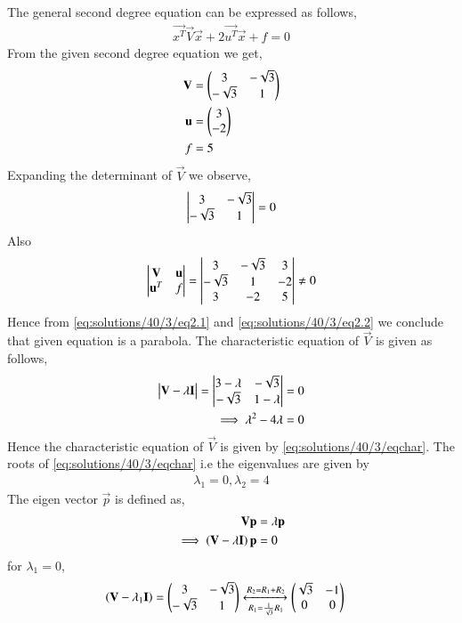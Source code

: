 The general second degree equation can be expressed as follows,
\begin{align}
\vec{x^T}\vec{V}\vec{x}+2\vec{u^T}\vec{x}+f=0\label{eq:solutions/40/3/eqmain}
\end{align}
From the given second degree equation we get,
\begin{align}
\mathbf{V} &= \begin{pmatrix}3&-\sqrt{3}\\-\sqrt{3}&1\end{pmatrix}\\ \label{eq:solutions/40/3/given1}
\mathbf{u} &= \begin{pmatrix}3\\-2\end{pmatrix}\\ 
f &= 5 \label{eq:solutions/40/3/given2}
\end{align}
Expanding the determinant of $\vec{V}$ we observe, 
\begin{align}
\begin{vmatrix}3&-\sqrt{3}\\-\sqrt{3}&1\end{vmatrix} = 0 \label{eq:solutions/40/3/eq2.1}
\end{align}
Also
\begin{align}
    \begin{vmatrix}\mathbf{V}&\mathbf{u} \\\mathbf{u}^T & f\end{vmatrix}=
    \begin{vmatrix}3&-\sqrt{3}&3\\-\sqrt{3}&1 &-2\\3 &-2&5\end{vmatrix}
    \neq 0\label{eq:solutions/40/3/eq2.2}\end{align}
Hence from \eqref{eq:solutions/40/3/eq2.1} and \eqref{eq:solutions/40/3/eq2.2} we conclude that given equation is a parabola. The characteristic equation of $\vec{V}$ is given as follows,
\begin{align}
\begin{vmatrix}\mathbf{V}-\lambda\mathbf{I}\end{vmatrix} = \begin{vmatrix}3-\lambda &-\sqrt{3}\\-\sqrt{3}& 1-\lambda\end{vmatrix} &= 0\\
\implies \lambda^2-4\lambda &= 0\label{eq:solutions/40/3/eqchar}
\end{align}
Hence the characteristic equation of $\vec{V}$ is given by \eqref{eq:solutions/40/3/eqchar}. The roots of \eqref{eq:solutions/40/3/eqchar} i.e the eigenvalues are given by
\begin{align}
\lambda_1=0, \lambda_2=4\label{eq:solutions/40/3/eqeigenvals}    
\end{align}
The eigen vector $\vec{p}$ is defined as, 
\begin{align}
\mathbf{V}\mathbf{p} &= \lambda\mathbf{p}\\
\implies\left(\mathbf{V}-\lambda\mathbf{I}\right)\mathbf{p}&=0 \label{eq:solutions/40/3/eqev}
\end{align}
for $\lambda_1=0$,
\begin{align}
\left(\mathbf{V}-\lambda_1\mathbf{I}\right)&=\begin{pmatrix}3&-\sqrt{3}\\-\sqrt{3}&1\end{pmatrix}\xleftrightarrow[R_1=\frac{1}{\sqrt{3}}R_1]{R_2=R_1+R_2}\begin{pmatrix}\sqrt{3}&-1\\0&0\end{pmatrix}\label{eq:solutions/40/3/eq2.3.0}
\end{align}
